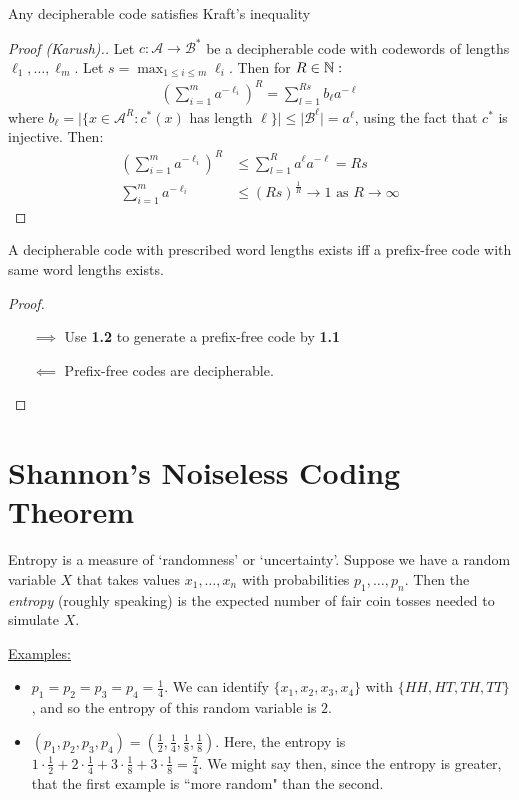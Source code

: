 \documentclass[10pt,a4paper]{article}
\begin{document}
\begin{theorem}[McMillan]
Any decipherable code satisfies Kraft's inequality
\end{theorem}
\begin{proof}[Proof (Karush).]
Let $c:\mathscr{A} \to \mathscr{B}^{\ast}$ be a decipherable code with codewords of lengths $\ell_1, \ldots, \ell_m$. Let $s = \max_{1 \leq i\leq m} \ell_i$. Then for $R \in \mathbb{N}:$
\begin{align*}
\left(\sum_{i=1}^{m} a^{-\ell_i}\right)^R = \sum_{l=1}^{Rs} b_{\ell}a^{-\ell}
\end{align*}
where $b_{\ell} = |\{x \in \mathscr{A}^R : c^{\ast}(x)$ has length $\ell\}| \leq |\mathscr{B}^{\ell}| = a^{\ell}$, using the fact that $c^{\ast}$ is injective. Then:
\begin{align*}
\left(\sum_{i=1}^m a^{-\ell_i}\right)^R &\leq \sum_{l=1}^R a^\ell a^{-\ell} = Rs\\
\sum_{i=1}^m a^{-\ell_i} &\leq (Rs)^{\frac1R} \to 1 \text{ as } R \to \infty
\end{align*}
\end{proof}

\begin{corollary}
A decipherable code with prescribed word lengths exists iff a prefix-free code with same word lengths exists.
\end{corollary}
\begin{proof}
\item
\begin{itemize}
\item[$\implies$] Use \textbf{1.2} to generate a prefix-free code by \textbf{1.1}
\item[$\impliedby$] Prefix-free codes are decipherable.
\end{itemize}
\end{proof}

 \section{Shannon's Noiseless Coding Theorem}
Entropy is a measure of `randomness' or `uncertainty'. Suppose we have a random variable $X$ that takes values $x_1, \ldots, x_n$ with probabilities $p_1, \ldots, p_n$. Then the \emph{entropy} (roughly speaking) is the expected number of fair coin tosses needed to simulate $X$.

\hspace*{-1em}\underline{Examples:}
\begin{itemize}
\item $p_1 = p_2 = p_3 = p_4 = \frac14$. We can identify $\{x_1, x_2, x_3, x_4\}$ with $\{HH, HT, TH, TT\}$, and so the entropy of this random variable is $2$.

\item $(p_1, p_2, p_3, p_4)=(\frac12,\frac14,\frac18,\frac18)$. Here, the entropy is $1\cdot\frac12+2\cdot\frac14+3\cdot\frac18+3\cdot\frac18 = \frac74$. We might say then, since the entropy is greater, that the first example is ``more random" than the second.
\end{itemize}
\end{document}
